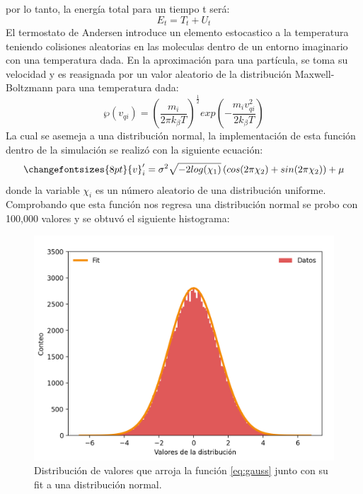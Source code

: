 por lo tanto, la energía total para un tiempo t será:
\begin{equation}
    \label{eq:e-tot}
    E_t=T_t+U_t
\end{equation}
El termostato de Andersen introduce un elemento estocastico a la temperatura teniendo colisiones aleatorias en las moleculas dentro de un 
entorno imaginario con una temperatura dada. En la aproximación para una partícula, se toma su velocidad y es reasignada por un valor aleatorio
de la distribución Maxwell-Boltzmann para una temperatura dada:
\begin{equation}
    \wp(v_{qi})= \left(\frac{m_i}{2\pi k_\beta T} \right)^\frac{1}{2} exp\left(- \frac{m_i v_{qi}^2}{2k_\beta T} \right)
\end{equation}
La cual se asemeja a una distribución normal, la implementación de esta función dentro de la simulación se realizó con la siguiente ecuación:
\begin{equation}
    \changefontsizes{8pt}
    {v}'_i= \sigma^2 \sqrt{-2log(\chi_1)} \left(cos(2\pi \chi_2) + sin(2\pi \chi_2) \right) + \mu 
    \label{eq:gauss}
\end{equation}
donde la variable $\chi_i$ es un número aleatorio de una distribución uniforme. Comprobando que esta función nos regresa una distribución normal
se probo con 100,000 valores y se obtuvó el siguiente histograma:
\begin{figure}[H]
    \centering
    \includegraphics[scale=0.4]{../Graphics/norm.png}
    \caption{Distribución de valores que arroja la función \ref{eq:gauss} junto con su fit a una distribución normal.}
    \label{fig:gauss}
\end{figure}